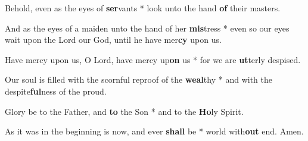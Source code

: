 \begin{multicols}{2}
	Behold, even as the eyes of \textbf{ser}vants * look unto the hand \textbf{of} their masters.
	
	And as the eyes of a maiden unto the hand of her \textbf{mis}tress * even so our eyes wait upon the Lord our God, until he have mer\textbf{cy} upon us.
	
	Have mercy upon us, O Lord, have mercy up\textbf{on} us * for we are \textbf{ut}terly despised.
	
	Our soul is filled with the scornful reproof of the \textbf{weal}thy * and with the despite\textbf{ful}ness of the proud.
	
	Glory be to the Father, and \textbf{to} the Son * and to the \textbf{Ho}ly Spirit.
	
	As it was in the beginning is now, and ever \textbf{shall} be * world with\textbf{out} end. Amen.
\end{multicols}